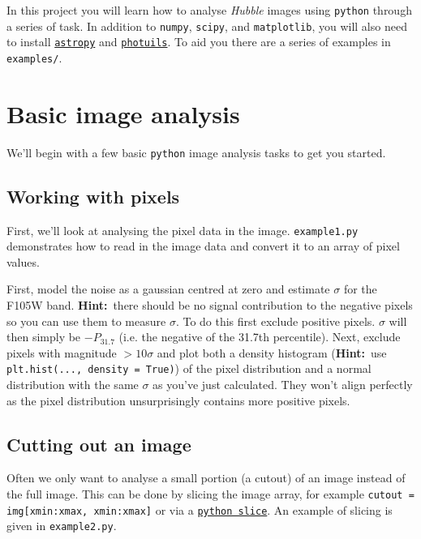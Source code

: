 \documentclass{article}
\newcommand{\hint}{\textbf{Hint:}}
\begin{document}
In this project you will learn how to analyse {\em Hubble} images using \texttt{python} through a series of task. In addition to \texttt{numpy}, \texttt{scipy}, and \texttt{matplotlib}, you will also need to install \href{https://www.astropy.org}{\texttt{astropy}} and \href{https://photutils.readthedocs.io/en/stable/}{\texttt{photuils}}. To aid you there are a series of examples in \texttt{examples/}.

\section{Basic image analysis} %

We'll begin with a few basic \texttt{python} image analysis tasks to get you started.

\subsection{Working with pixels}

First, we'll look at analysing the pixel data in the image. \texttt{example1.py} demonstrates how to read in the image data and convert it to an array of pixel values.

\begin{question}
First, model the noise as a gaussian centred at zero and estimate $\sigma$ for the F105W band. \hint\ there should be no signal contribution to the negative pixels so you can use them to measure $\sigma$. To do this first exclude positive pixels. $\sigma$ will then simply be $-P_{31.7}$ (i.e. the negative of the 31.7th percentile). Next, exclude pixels with magnitude $>10\sigma$ and plot both a density histogram (\hint\ use \texttt{plt.hist(..., density = True)}) of the pixel distribution and a normal distribution with the same $\sigma$ as you've just calculated. They won't align perfectly as the pixel distribution unsurprisingly contains more positive pixels.
\end{question}

\subsection{Cutting out an image}

Often we only want to analyse a small portion (a cutout) of an image instead of the full image. This can be done by slicing the image array, for example  \texttt{cutout = img[xmin:xmax, xmin:xmax]} or via a \href{https://docs.python.org/3/library/functions.html?highlight=slice#slice}{\texttt{python slice}}. An example of slicing is given in \texttt{example2.py}.
\end{document}
